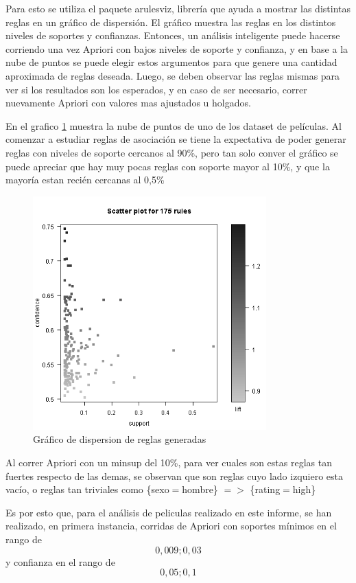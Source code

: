 \documentclass[journal]{IEEEtran}
\begin{document}
Para esto se utiliza el paquete arulesviz, librería que ayuda a mostrar las 
distintas reglas en un gráfico de dispersión. El gráfico muestra las reglas
en los distintos niveles de soportes y confianzas. Entonces, un análisis inteligente
puede hacerse corriendo una vez Apriori con bajos niveles de soporte y confianza, y 
en base a la nube de puntos se puede elegir estos argumentos para que genere 
una  cantidad aproximada de reglas deseada. Luego, se deben observar las reglas mismas para ver
si los resultados son los esperados, y en caso de ser necesario, correr nuevamente
Apriori con valores mas ajustados u holgados.

En el grafico \ref{arulesviz} muestra la nube de puntos de uno de los dataset de películas.
Al comenzar a estudiar reglas de asociación se tiene la expectativa de poder generar
reglas con niveles de soporte cercanos al 90\%, pero tan solo conver el gráfico
se puede apreciar que hay muy pocas reglas con soporte mayor al 10\%, y que la mayoría
estan recién cercanas al 0,5\%

\begin{figure}[ht!]
\centering
\includegraphics[width=90mm]{arulesviz.png}
\caption{Gráfico de dispersion de reglas generadas}
\label{arulesviz}
\end{figure}

Al correr Apriori con un minsup del 10\%, para ver cuales son estas reglas tan
fuertes respecto de las demas, se observan que son reglas cuyo lado izquiero
esta vacío, o reglas tan triviales como \{sexo$=$hombre\} $=$$>$ \{rating$=$high\}

Es por esto que, para el análisis de peliculas realizado en este informe, se han
realizado, en primera instancia, 
 corridas de Apriori con soportes mínimos en el rango de \[0,009 ; 0,03\]
y confianza en el rango de \[0,05 ; 0,1\]
\end{document}
